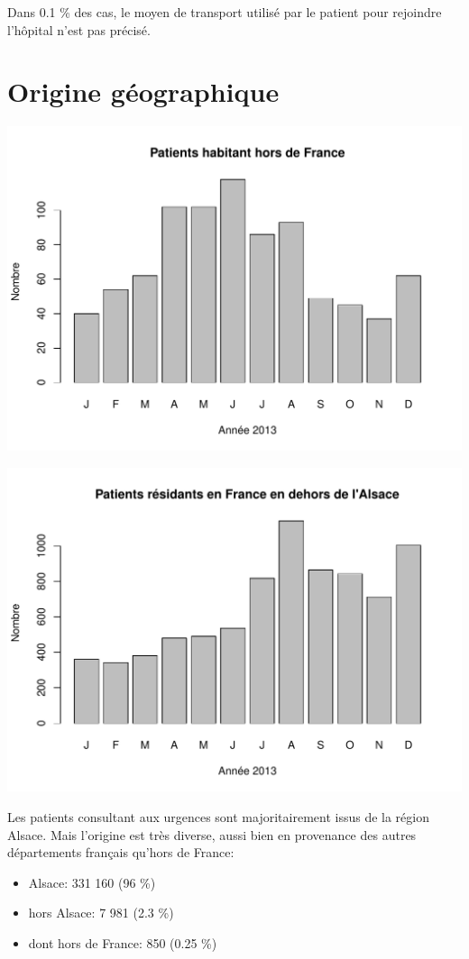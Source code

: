 \documentclass[12pt,english,french,twoside]{book}\usepackage[]{graphicx}\usepackage[]{color}
\makeatletter
\def\maxwidth{ %
  \ifdim\Gin@nat@width>\linewidth
    \linewidth
  \else
    \Gin@nat@width
  \fi
}
\newenvironment{knitrout}{}{} %
\makeatother
\begin{document}
Dans 0.1 \% des cas, le moyen de transport utilisé par le patient pour rejoindre l'hôpital n'est pas précisé.

\section*{Origine géographique}


\begin{knitrout}
\color{fgcolor}
\includegraphics[width=\maxwidth]{figure/origine_geo-1} 

\includegraphics[width=\maxwidth]{figure/origine_geo-2} 

\end{knitrout}
Les patients consultant aux urgences sont majoritairement issus de la région Alsace. Mais l'origine est très diverse, aussi bien en provenance des autres départements français qu'hors de France:
 \begin{itemize}
   \item Alsace: 331 160 (96 \%) 
   \item hors Alsace: 7 981 (2.3 \%) 
   \item dont hors de France: 850 (0.25 \%) 
 \end{itemize}
\end{document}
